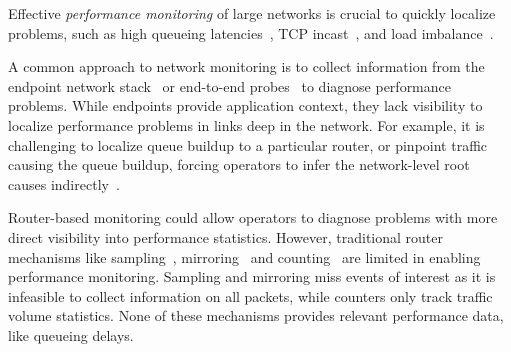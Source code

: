 
Effective {\em performance monitoring} of large networks is crucial to quickly
localize problems, such as high queueing latencies~\cite{int}, TCP
incast~\cite{tcpincast}, %
and load imbalance~\cite{conga}.

A common approach to network monitoring is to collect information from the
endpoint network stack~\cite{minlan-snap, dapper-sosr, pathdump, trumpet} or
end-to-end probes~\cite{pingmesh} to diagnose performance problems.  While
endpoints provide application context, they lack visibility to localize
performance problems in links deep in the network. For example, it is
challenging to localize queue buildup to a particular router, or pinpoint
traffic causing the queue buildup, forcing operators to infer the network-level
root causes indirectly~\cite{pingmesh}.

Router-based monitoring could allow operators to diagnose problems with more
direct visibility into performance statistics. However, traditional router
mechanisms like sampling~\cite{netflow, sflow}, mirroring~\cite{cisco-span,
  netsight, everflow} and counting~\cite{cormode, univmon} are limited in enabling
performance monitoring.
%
Sampling and mirroring miss events of interest as it is infeasible to collect
information on all packets, while counters only track traffic volume
statistics. None of these mechanisms provides relevant performance data, like
queueing delays.

